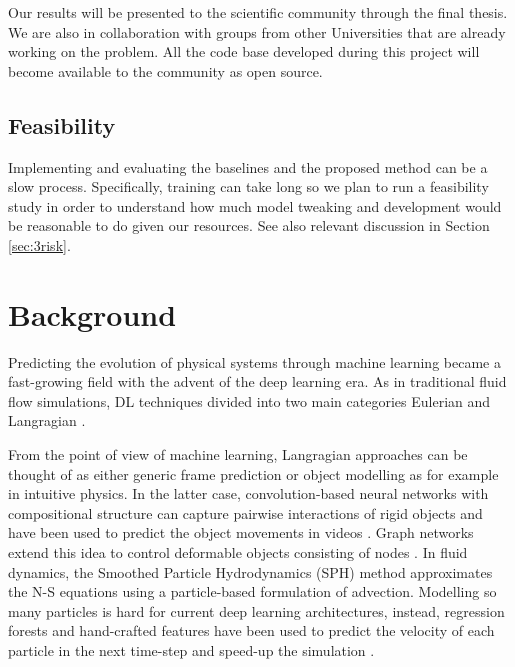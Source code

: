 \documentclass[a4paper,11pt]{article}
\begin{document}
Our results will be presented to the scientific community through the final thesis. We are also in collaboration with groups from other Universities that are already working on the problem. All the code base developed during this project will become available to the community as open source.

\subsection{Feasibility}
\vskip -2mm

Implementing and evaluating the baselines and the proposed method can be a slow process. Specifically, training can take long so we plan to run a feasibility study in order to understand how much model tweaking and development would be reasonable to do given our resources. See also relevant discussion in Section \ref{sec:3risk}. 

\section{Background}\label{sec:2background}
\vskip -2mm
Predicting the evolution of physical systems through machine learning became a fast-growing field with the advent of the deep learning era. As in traditional fluid flow simulations, DL techniques divided into two main categories Eulerian and Langragian \cite{zhang2007comparison}.

 From the point of view of machine learning, Langragian approaches can be thought of as either generic frame prediction or object modelling as for example in intuitive physics. In the latter case, convolution-based neural networks with compositional structure can capture pairwise interactions of rigid objects and have been used to predict the object movements in videos \cite{watters2017visualvin}. Graph networks extend this idea to control deformable objects consisting of nodes \cite{battaglia2018relationalgn}. In fluid dynamics, the Smoothed Particle Hydrodynamics (SPH) method approximates the N-S equations using a particle-based formulation of advection. Modelling so many particles is hard for current deep learning architectures, instead, regression forests and hand-crafted features have been used to predict the velocity of each particle in the next time-step and speed-up the simulation \cite{jeong2015dataladickyforest}. 
 
\end{document}
